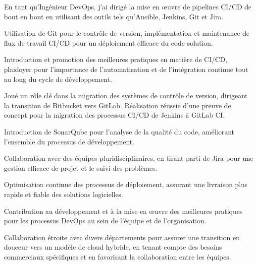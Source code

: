 \begin{cventries}
{{\begin{cvitems}
        \item {En tant qu'Ingénieur DevOps, j'ai dirigé la mise en œuvre de pipelines CI/CD de bout en bout en utilisant des outils tels qu'Ansible, Jenkins, Git et Jira.}
        \item {Utilisation de Git pour le contrôle de version, implémentation et maintenance de flux de travail CI/CD pour un déploiement efficace du code solution.}
        \item {Introduction et promotion des meilleures pratiques en matière de CI/CD, plaidoyer pour l'importance de l'automatisation et de l'intégration continue tout au long du cycle de développement.}
        \item {Joué un rôle clé dans la migration des systèmes de contrôle de version, dirigeant la transition de Bitbucket vers GitLab. Réalisation réussie d'une preuve de concept pour la migration des processus CI/CD de Jenkins à GitLab CI.}
        \item {Introduction de SonarQube pour l'analyse de la qualité du code, améliorant l'ensemble du processus de développement.}
        \item {Collaboration avec des équipes pluridisciplinaires, en tirant parti de Jira pour une gestion efficace de projet et le suivi des problèmes.}
        \item {Optimisation continue des processus de déploiement, assurant une livraison plus rapide et fiable des solutions logicielles.}
        \item {Contribution au développement et à la mise en œuvre des meilleures pratiques pour les processus DevOps au sein de l'équipe et de l'organisation.}
        \item {Collaboration étroite avec divers départements pour assurer une transition en douceur vers un modèle de cloud hybride, en tenant compte des besoins commerciaux spécifiques et en favorisant la collaboration entre les équipes.}
      \end{cvitems}
        
    }

}
\end{cventries}
